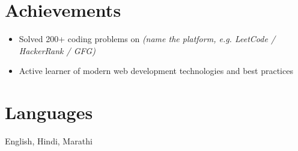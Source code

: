\documentclass[10.5pt,a4paper]{article}
\newcommand{\resitem}[1]{\item #1}
\begin{document}
\section*{Achievements}
\begin{itemize}
    \resitem{Solved 200+ coding problems on \underline{\hspace{3cm}} \textit{(name the platform, e.g. LeetCode / HackerRank / GFG)}}
    \resitem{Active learner of modern web development technologies and best practices}
\end{itemize}

\section*{Languages}
English, Hindi, Marathi
\end{document}
